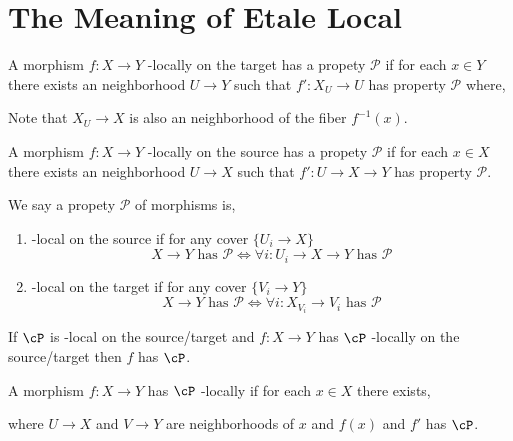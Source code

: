 \documentclass[12pt]{article}
\begin{document}
\section{The Meaning of Etale Local}

\begin{defn}
A morphism $f : X \to Y$ \etale-locally on the target has a propety $\mathcal{P}$ if for each $x \in Y$ there exists an \etale neighborhood $U \to Y$ such that $f' : X_U \to U$ has property $\mathcal{P}$ where,
\begin{center}
\end{center}
Note that $X_U \to X$ is also an \etale neighborhood of the fiber $f^{-1}(x)$.
\end{defn}

\begin{defn}
A morphism $f : X \to Y$ \etale-locally on the source has a propety $\mathcal{P}$ if for each $x \in X$ there exists an \etale neighborhood $U \to X$ such that $f' : U \to X \to Y$ has property $\mathcal{P}$.
\end{defn}

\begin{defn}
We say a propety $\mathcal{P}$ of morphisms is,
\begin{enumerate}
\item \etale-local on the source if for any \etale cover $\{ U_i \to X \}$ 
\[ X \to Y \text{ has } \mathcal{P} \iff \forall i : U_i \to X \to Y \text{ has } \mathcal{P} \]
\item \etale-local on the target if for any \etale cover $\{ V_i \to Y \}$ 
\[ X \to Y \text{ has } \mathcal{P} \iff \forall i : X_{V_i} \to V_i \text{ has } \mathcal{P} \]
\end{enumerate}
\end{defn}

\begin{rmk}
If $\cP$ is \etale-local on the source/target and $f : X \to Y$ has $\cP$ \etale-locally on the source/target then $f$ has $\cP$.
\end{rmk}

\begin{defn}
A morphism $f : X \to Y$ has $\cP$ \etale-locally if for each $x \in X$ there exists,
\begin{center}
\end{center}
where $U \to X$ and $V \to Y$ are \etale neighborhoods of $x$ and $f(x)$ and $f'$ has $\cP$.
\end{defn}
\end{document}
